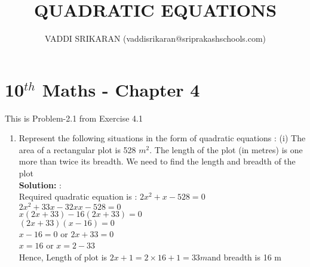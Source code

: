 \documentclass[12pt]{article}
\title{QUADRATIC EQUATIONS}
\author{VADDI SRIKARAN (vaddisrikaran@sriprakashschools.com)}
\newcommand{\solution}{\noindent \textbf{Solution: }}
\begin{document}
    \maketitle
    \section*{10$^{th}$ Maths - Chapter 4}
    This is Problem-2.1 from Exercise 4.1
    \begin{enumerate}
    \item Represent the following situations in the form of quadratic equations :
(i) The area of a rectangular plot is 528 $m^2$. The length of the plot (in metres) is one more than twice its breadth. We need to find the length and breadth of the plot\\
\solution:\\Required quadratic equation is :
${2x^2+x-528=0}$\\
${2x^2+33 x-32x x-528=0}$\\
${x(2x+33)-16(2x+33)=0}$\\
${(2x+33)(x-16)=0}$\\
${x-16=0}$ or ${2x+33=0}$\\
${x=16}$ or ${x=2-33}$\\
Hence, Length of plot is ${2x+1=2×16+1=33m}$and breadth is 16 m\\

	

\end{enumerate}
\end{document}
